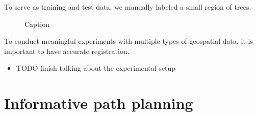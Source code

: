 To serve as training and test data, we manually labeled a small region of trees. 

\begin{figure}
    \hfill
    \caption{Caption}
    \label{fig:enter-label}
\end{figure}

To conduct meaningful experiments with multiple types of geospatial data, it is important to have accurate registration. 


\begin{itemize}
    \item TODO finish talking about the experimental setup 
\end{itemize}


\section{Informative path planning}

